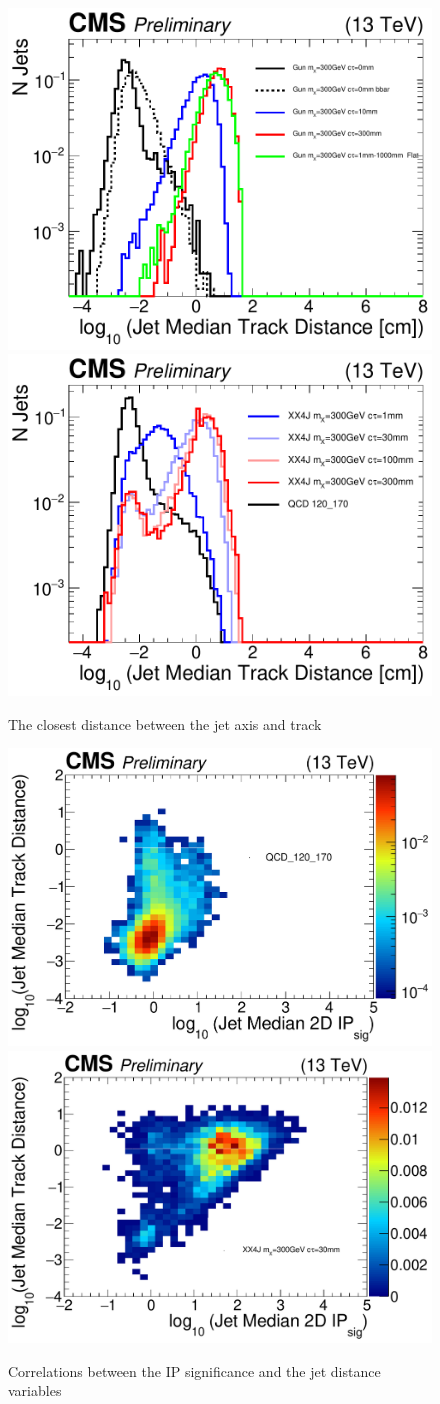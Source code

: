 \begin{figure}
\begin{center}
\includegraphics[width=.45\textwidth]{figures/an_jetid/VTX_MATCH_IP/GUN_log_jetMedianTrackDist}
\includegraphics[width=.45\textwidth]{figures/an_jetid/VTX_MATCH_IP/XX4J_log_jetMedianTrackDist}
\end{center}
\caption{The closest distance between the jet axis and track}
\label{fig:jetDist}
\end{figure}


\begin{figure}
\begin{center}
\includegraphics[width=.45\textwidth]{figures/an_jetid/VTX_MATCH_IP/QCD_2D_ipsig_jetDist}
\includegraphics[width=.45\textwidth]{figures/an_jetid/VTX_MATCH_IP/XX4J_2D_ipsig_jetDist}
\end{center}
\caption{Correlations between the IP significance and the jet distance variables}
\label{fig:jetDist_ipsig}
\end{figure}

